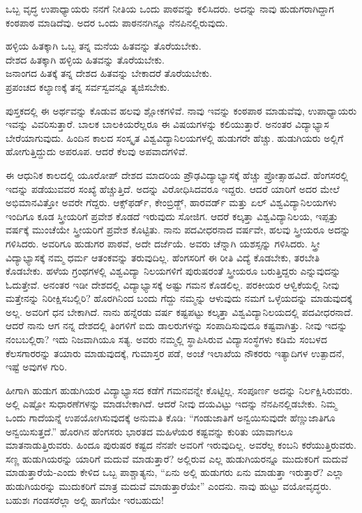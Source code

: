 ಒಬ್ಬ ವೃದ್ಧ ಉಪಾಧ್ಯಾಯರು ನನಗೆ ನೀತಿಯ ಒಂದು ಪಾಠವನ್ನು ಕಲಿಸಿದರು. ಅದನ್ನು ನಾವು ಹುಡುಗರಾಗಿದ್ದಾಗ ಕಂಠಪಾಠ ಮಾಡಿದೆವು. ಅದರ ಒಂದು ಪಾಠ\break ನನಗಿನ್ನೂ ನೆನಪಿನಲ್ಲಿರುವುದು.

\begin{myquote}
ಹಳ್ಳಿಯ ಹಿತಕ್ಕಾಗಿ ಒಬ್ಬ ತನ್ನ ಮನೆಯ ಹಿತವನ್ನು ತೊರೆಯಬೇಕು.\\ದೇಶದ ಹಿತಕ್ಕಾಗಿ ಹಳ್ಳಿಯ ಹಿತವನ್ನು ತೊರೆಯಬೇಕು.\\ಜನಾಂಗದ ಹಿತಕ್ಕೆ ತನ್ನ ದೇಶದ ಹಿತವನ್ನು ಬೇಕಾದರೆ ತೊರೆಯಬೇಕು.\\ಪ್ರಪಂಚದ ಕಲ್ಯಾಣಕ್ಕೆ ತನ್ನ ಸರ್ವಸ್ವವನ್ನೂ ತ್ಯಜಿಸಬೇಕು.
\end{myquote}

ಪುಸ್ತಕದಲ್ಲಿ ಈ ಅರ್ಥವನ್ನು ಕೊಡುವ ಹಲವು ಶ್ಲೋಕಗಳಿವೆ. ನಾವು ಇವನ್ನು ಕಂಠಪಾಠ ಮಾಡುವೆವು, ಉಪಾಧ್ಯಾಯರು ಇವನ್ನು ವಿವರಿಸುತ್ತಾರೆ. ಬಾಲಕ ಬಾಲಕಿಯರೆಲ್ಲರೂ ಈ ವಿಷಯಗಳನ್ನು ಕಲಿಯುತ್ತಾರೆ. ಅನಂತರ ವಿದ್ಯಾಭ್ಯಾಸ ಬೇರೆಯಾಗುವುದು. ಹಿಂದಿನ ಕಾಲದ ಸಂಸ್ಕೃತ ವಿಶ್ವವಿದ್ಯಾನಿಲಯಗಳಲ್ಲಿ ಹುಡುಗರೇ ಹೆಚ್ಚು. ಹುಡುಗಿಯರು ಅಲ್ಲಿಗೆ ಹೋಗುತ್ತಿದ್ದುದು ಅಪರೂಪ. ಆದರೆ ಕೆಲವು ಅಪವಾದಗಳಿವೆ.

ಈ ಆಧುನಿಕ ಕಾಲದಲ್ಲಿ ಯೂರೋಪ್​ ದೇಶದ ಮಾದರಿಯ ಪ್ರೌಢವಿದ್ಯಾಭ್ಯಾಸಕ್ಕೆ \break ಹೆಚ್ಚು ಪ್ರೋತ್ಸಾಹವಿದೆ. ಹೆಂಗಸರಲ್ಲಿ ಇದನ್ನು ಪಡೆಯುವವರ ಸಂಖ್ಯೆ ಹೆಚ್ಚುತ್ತಿದೆ. ಅದನ್ನು ವಿರೋಧಿಸಿದವರೂ ಇದ್ದರು. ಆದರೆ ಯಾರಿಗೆ ಅದರ ಮೇಲೆ ಅಭಿಮಾನವಿತ್ತೋ ಅವರೇ ಗೆದ್ದರು. ಆಕ್ಸ್​ಫರ್ಡ್​, ಕೇಂಬ್ರಿಡ್ಜ್​, ಹಾರವರ್ಡ್​ ಮತ್ತು ಏಲ್​ ವಿಶ್ವವಿದ್ಯಾನಿಲಯಗಳು ಇಂದಿಗೂ ಕೂಡ ಸ್ತ್ರೀಯರಿಗೆ ಪ್ರವೇಶ ಕೊಡದೆ ಇರುವುದು ಸೋಜಿಗ. ಆದರೆ ಕಲ್ಕತ್ತಾ ವಿಶ್ವವಿದ್ಯಾನಿಲಯ, ಇಪ್ಪತ್ತು ವರ್ಷಕ್ಕೆ ಮುಂಚೆಯೇ ಸ್ತ್ರೀಯರಿಗೆ ಪ್ರವೇಶ ಕೊಟ್ಟಿತು. ನಾನು ಪದವೀಧರನಾದ ವರ್ಷವೇ, ಹಲವು ಸ್ತ್ರೀಯರೂ ಅದನ್ನು ಗಳಿಸಿದರು. ಅವರಿಗೂ ಹುಡುಗರ ಪಾಠವೆ, ಅದೇ ದರ್ಜೆಯೆ. ಅವರು ಚೆನ್ನಾಗಿ ಯಶಸ್ಸನ್ನು ಗಳಿಸಿದರು. ಸ್ತ್ರೀ ವಿದ್ಯಾಭ್ಯಾಸಕ್ಕೆ ನಮ್ಮ ಧರ್ಮ ಆತಂಕವನ್ನು ತರುವುದಿಲ್ಲ. ಹೆಂಗಸರಿಗೆ ಈ ರೀತಿ ವಿದ್ಯೆ ಕೊಡಬೇಕು, ತರಬೇತಿ ಕೊಡಬೇಕು. ಹಳೆಯ ಗ್ರಂಥಗಳಲ್ಲಿ ವಿಶ್ವವಿದ್ಯಾ ನಿಲಯಗಳಿಗೆ ಪುರುಷರಂತೆ ಸ್ತ್ರೀಯರೂ ಬರುತ್ತಿದ್ದರು ಎನ್ನುವುದನ್ನು ಓದುತ್ತೇವೆ. ಅನಂತರ ಇಡೀ ದೇಶದಲ್ಲಿ ವಿದ್ಯಾಭ್ಯಾಸಕ್ಕೆ ಅಷ್ಟು ಗಮನ ಕೊಡಲಿಲ್ಲ. ಪರಕೀಯರ ಆಳ್ವಿಕೆಯಲ್ಲಿ ನೀವು ಮತ್ತೇನನ್ನು ನಿರೀಕ್ಷಿಸಬಲ್ಲಿರಿ? ಹೊರಗಿನಿಂದ ಬಂದು ಗೆದ್ದು ನಮ್ಮನ್ನು ಆಳುವುದು ನಮಗೆ ಒಳ್ಳೆಯದನ್ನು ಮಾಡುವುದಕ್ಕೆ ಅಲ್ಲ. ಅವರಿಗೆ ಧನ ಬೇಕಾಗಿದೆ. ನಾನು ಹನ್ನೆರಡು ವರ್ಷ ಕಷ್ಟಪಟ್ಟು ಕಲ್ಕತ್ತಾ ವಿಶ್ವವಿದ್ಯಾನಿಲಯದಲ್ಲಿ ಪದವೀಧರನಾದೆ. ಆದರೆ ನಾನು ಆಗ ನನ್ನ ದೇಶದಲ್ಲಿ ತಿಂಗಳಿಗೆ ಐದು ಡಾಲರುಗಳನ್ನು ಸಂಪಾದಿಸುವುದೂ ಕಷ್ಟವಾಗಿತ್ತು. ನೀವು ಇದನ್ನು ನಂಬಬಲ್ಲಿರಾ? ಇದು ನಿಜವಾಗಿಯೂ ಸತ್ಯ. ಅವರು ನಮ್ಮಲ್ಲಿ ಸ್ಥಾಪಿಸಿರುವ ವಿದ್ಯಾಸಂಸ್ಥೆಗಳು ಕಡಿಮೆ ಸಂಬಳದ ಕೆಲಸಗಾರರನ್ನು ತಯಾರು ಮಾಡುವುದಕ್ಕೆ, ಗುಮಾಸ್ತರ ಪಡೆ, ಅಂಚೆ ಇಲಾಖೆಯ ನೌಕರರು ಇತ್ಯಾದಿಗಳ ಉತ್ಪಾದನೆ, ಇಷ್ಟೆ ಅವುಗಳ ಗುರಿ.

ಹೀಗಾಗಿ ಹುಡುಗ ಹುಡುಗಿಯರ ವಿದ್ಯಾಭ್ಯಾಸದ ಕಡೆಗೆ ಗಮನವನ್ನೇ ಕೊಟ್ಟಿಲ್ಲ. ಸಂಪೂರ್ಣ ಅದನ್ನು ನಿರ್ಲಕ್ಷಿಸಿರುವರು. ಅಲ್ಲಿ ಎಷ್ಟೋ ಸುಧಾರಣೆಗಳನ್ನು ಮಾಡಬೇಕಾಗಿದೆ. ಆದರೆ ನೀವು ದಯವಿಟ್ಟು ಇದನ್ನು ನೆನಪಿನಲ್ಲಿಡಬೇಕು. ನಿಮ್ಮ ಒಂದು ಗಾದೆಯನ್ನೆ ಉಪಯೋಗಿಸುವುದಕ್ಕೆ ಅನುಮತಿ ಕೊಡಿ: “ಗಂಡುಜಾತಿಗೆ ಅನ್ವಯಿಸುವುದೇ ಹೆಣ್ಣುಜಾತಿಗೂ ಅನ್ವಯಿಸುತ್ತದೆ.” ಹೊರಗಿನ ಹೆಂಗಸರು ಭಾರತದ ಮಹಿಳೆಯರ ಕಷ್ಟವನ್ನು ಕುರಿತು ಯಾವಾಗಲೂ ಮಾತನಾಡುತ್ತಿರುವರು. ಹಿಂದೂ ಪುರುಷರ ಕಷ್ಟದ ನೆನಪೇ ಅವರಿಗೆ ಇರುವುದಿಲ್ಲ. ಅವರೆಲ್ಲ ಕಂಬನಿ ಕರೆಯುತ್ತಿರುವರು. ಸಣ್ಣ ಹುಡುಗಿಯರನ್ನು ಯಾರಿಗೆ ಮದುವೆ ಮಾಡುತ್ತಾರೆ? ಅಲ್ಲಿರುವ ಎಲ್ಲ ಹುಡುಗಿಯರನ್ನೂ ಮುದುಕರಿಗೆ ಮದುವೆ ಮಾಡುತ್ತಾರೆಯೆ-ಎಂದು ಕೇಳಿದ ಒಬ್ಬ ಪಾಶ್ಚಾತ್ಯನು, “ಏನು ಅಲ್ಲಿ ಹುಡುಗರು ಏನು ಮಾಡುತ್ತಾ ಇರುತ್ತಾರೆ? ಎಲ್ಲಾ ಹುಡುಗಿಯರನ್ನು ಮುದುಕರಿಗೆ ಮಾತ್ರ ಮದುವೆ ಮಾಡುತ್ತಾರೆಯೇ” ಎಂದನು. ನಾವು ಹುಟ್ಟು ವಯೋವೃದ್ಧರು. ಬಹುಶಃ ಗಂಡಸರೆಲ್ಲಾ ಅಲ್ಲಿ ಹಾಗೆಯೇ ಇರಬಹುದು!

